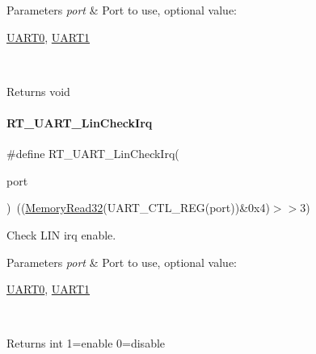 \begin{DoxyParams}{Parameters}
{\em port} & Port to use, optional value\+:
\begin{DoxyCode}
\mbox{\hyperlink{a00173_a0508661f121639ffdee7de2353a0def2}{UART0}}, \mbox{\hyperlink{a00173_a8d69bf04d07af4fbbab5a8bd291f65ff}{UART1}}
\end{DoxyCode}
 \\
\hline
\end{DoxyParams}
\begin{DoxyReturn}{Returns}
void 
\end{DoxyReturn}
\mbox{\label{a00173_a2e2715198f9716282584f34a7f472649}} 
\paragraph{\texorpdfstring{R\+T\+\_\+\+U\+A\+R\+T\+\_\+\+Lin\+Check\+Irq}{RT\_UART\_LinCheckIrq}}
{\footnotesize\ttfamily \#define R\+T\+\_\+\+U\+A\+R\+T\+\_\+\+Lin\+Check\+Irq(\begin{DoxyParamCaption}\item[{}]{port }\end{DoxyParamCaption})~((\mbox{\hyperlink{a00068_a2d484dc15bdf30ee11ab3b05f31f0e16}{Memory\+Read32}}(U\+A\+R\+T\+\_\+\+C\+T\+L\+\_\+\+R\+EG(port))\&0x4)$>$$>$3)}



Check L\+IN irq enable. 


\begin{DoxyParams}{Parameters}
{\em port} & Port to use, optional value\+:
\begin{DoxyCode}
\mbox{\hyperlink{a00173_a0508661f121639ffdee7de2353a0def2}{UART0}}, \mbox{\hyperlink{a00173_a8d69bf04d07af4fbbab5a8bd291f65ff}{UART1}}
\end{DoxyCode}
 \\
\hline
\end{DoxyParams}
\begin{DoxyReturn}{Returns}
int 1=enable 0=disable 
\end{DoxyReturn}
\mbox{\label{a00173_ad1e6c13693e5ea54a55ce78635617178}} 
